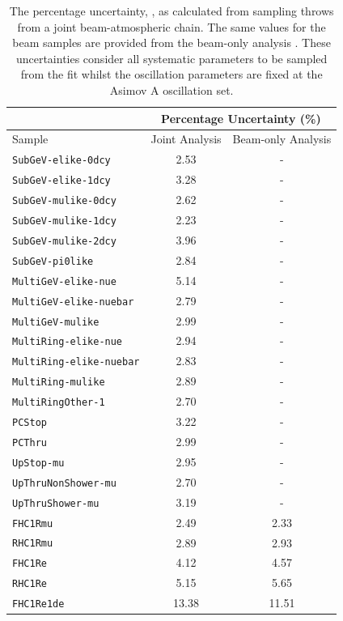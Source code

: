 \begin{table}[ht!]
    \centering
    \begin{tabular}{|l|c|c|}
      \hline
      & \multicolumn{2}{|c|}{Percentage Uncertainty (\%)} \\
      \hline
      Sample & Joint Analysis & Beam-only Analysis \\
      \hline
      \texttt{SubGeV-elike-0dcy} & 2.53 & - \\
      \texttt{SubGeV-elike-1dcy} & 3.28 & - \\
      \texttt{SubGeV-mulike-0dcy} & 2.62 & - \\
      \texttt{SubGeV-mulike-1dcy} & 2.23 & - \\
      \texttt{SubGeV-mulike-2dcy} & 3.96 & - \\
      \texttt{SubGeV-pi0like} & 2.84 & - \\
      \texttt{MultiGeV-elike-nue} & 5.14 & - \\
      \texttt{MultiGeV-elike-nuebar} & 2.79 & - \\
      \texttt{MultiGeV-mulike} & 2.99 & - \\
      \texttt{MultiRing-elike-nue} & 2.94 & - \\
      \texttt{MultiRing-elike-nuebar} & 2.83 & - \\
      \texttt{MultiRing-mulike} & 2.89 & - \\
      \texttt{MultiRingOther-1} & 2.70 & - \\
      \texttt{PCStop} & 3.22 & - \\
      \texttt{PCThru} & 2.99 & - \\
      \texttt{UpStop-mu} & 2.95 & - \\
      \texttt{UpThruNonShower-mu} & 2.70 & - \\
      \texttt{UpThruShower-mu} & 3.19 & - \\
      \texttt{FHC1Rmu} & 2.49 & 2.33 \\
      \texttt{RHC1Rmu} & 2.89 & 2.93 \\
      \texttt{FHC1Re} & 4.12 & 4.57 \\
      \texttt{RHC1Re} & 5.15 & 5.65 \\
      \texttt{FHC1Re1de} & 13.38 & 11.51 \\
      \hline
      \hline
    \end{tabular}
    \caption{The percentage uncertainty, , as calculated from sampling  throws from a joint beam-atmospheric chain. The same values for the beam samples are provided from the beam-only analysis \cite{Dunne2020-uf, t2k_tn_393}. These uncertainties consider all systematic parameters to be sampled from the fit whilst the oscillation parameters are fixed at the Asimov A oscillation set.}
    \label{tab:OscillationAnalysis_PosteriorPredEventRateUncertainty}
\end{table}

